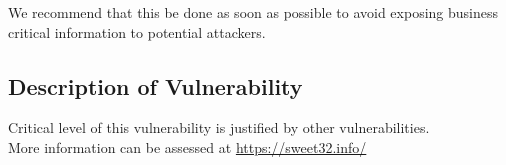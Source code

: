 \documentclass[11pt, oneside]{article}   	%
\begin{document}
We recommend that this be done as soon as possible to avoid exposing business
critical information to potential attackers.

\subsection{Description of Vulnerability}
Critical level of this vulnerability is justified by other vulnerabilities.\\

More information can be assessed at \url{https://sweet32.info/}
\end{document}
